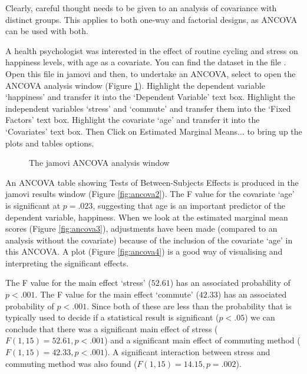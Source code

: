 Clearly, careful thought needs to be given to an analysis of covariance with distinct groups. This applies to both one-way and factorial designs, as ANCOVA can be used with both.


A health psychologist was interested in the effect of routine cycling and stress on happiness levels, with age as a covariate. You can find the dataset in the file . Open this file in jamovi and then, to undertake an ANCOVA, select    to open the ANCOVA analysis window (Figure \ref{fig:ancova1}). Highlight the dependent variable ‘happiness’ and transfer it into the ‘Dependent Variable’ text box. Highlight the independent variables  ‘stress’ and ‘commute’ and transfer them  into the ‘Fixed Factors’ text box. Highlight the covariate ‘age’ and transfer it  into the ‘Covariates’ text box. Then Click on Estimated Marginal Means... to bring up the plots and tables options. 

\begin{figure}[!htb]
\begin{center}
\caption{The jamovi ANCOVA analysis window}
\label{fig:ancova1}
\HR
\end{center}
\end{figure}

An ANCOVA table showing Tests of Between-Subjects Effects is produced in the jamovi results window (Figure \ref{fig:ancova2}). The F value for the covariate ‘age’ is significant at $p=.023$, suggesting that age is an important predictor of the dependent variable, happiness. When we look at the estimated marginal mean scores (Figure \ref{fig:ancova3}), adjustments have been made (compared to an analysis without the covariate) because of the inclusion of the covariate ‘age’ in this ANCOVA. A plot (Figure \ref{fig:ancova4}) is a good way of visualising and interpreting the significant effects. 

The F value for the main effect ‘stress’ ($52.61$) has an associated probability of $p<.001$. The F value for the main effect ‘commute’ ($42.33$) has an associated probability of $p<.001$. Since both of these are less than the probability that is typically used to decide if a statistical result is significant ($p<.05$) we can conclude that there was a significant main effect of stress ($F(1,15)=52.61, p<.001$) and a significant main effect of commuting method ($F(1,15)=42.33, p<.001$). A significant interaction between stress and commuting method was also found ($F(1,15)=14.15, p=.002$).

